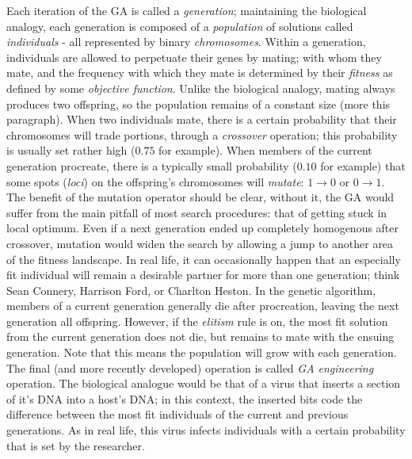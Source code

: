 \documentclass{book}
\begin{document}
Each iteration of the GA is called a \emph{generation}; maintaining the
biological analogy, each generation is composed of a \emph{population} of
solutions called \emph{individuals} - all represented by binary \emph{%
chromosomes}. Within a generation, individuals are allowed to perpetuate
their genes by mating; with whom they mate, and the frequency with which
they mate is determined by their \emph{fitness} as defined by some \emph{%
objective function}. Unlike the biological analogy, mating always produces
two offspring, so the population remains of a constant size (more this
paragraph). When two individuals mate, there is a certain probability that
their chromosomes will trade portions, through a \emph{crossover} operation;
this probability is usually set rather high ($0.75$ for example). When
members of the current generation procreate, there is a typically small
probability ($0.10$ for example) that some spots (\emph{loci}) on the
offspring's chromosomes will \emph{mutate}: $1\longrightarrow 0$ or $%
0\longrightarrow 1$. The benefit of the mutation operator should be clear,
without it, the GA would suffer from the main pitfall of most search
procedures: that of getting stuck in local optimum. Even if a next
generation ended up completely homogenous after crossover, mutation would
widen the search by allowing a jump to another area of the fitness
landscape. In real life, it can occasionally happen that an especially fit
individual will remain a desirable partner for more than one generation;
think Sean Connery, Harrison Ford, or Charlton Heston. In the genetic
algorithm, members of a current generation generally die after procreation,
leaving the next generation all offspring. However, if the \emph{elitism}
rule is on, the most fit solution from the current generation does not die,
but remains to mate with the ensuing generation. Note that this means the
population will grow with each generation. The final (and more recently
developed) operation is called \emph{GA engineering} operation. The
biological analogue would be that of a virus that inserts a section of it's
DNA into a host's DNA; in this context, the inserted bits code the
difference between the most fit individuals of the current and previous
generations. As in real life, this virus infects individuals with a certain
probability that is set by the researcher.
\end{document}
